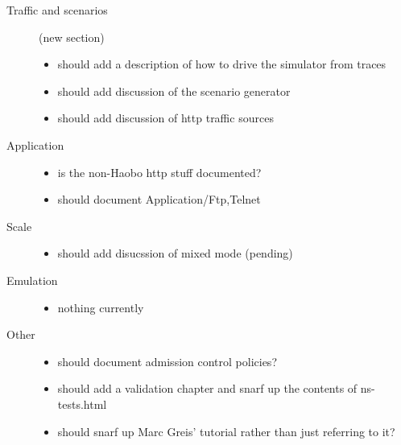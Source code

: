 \begin{description}
\item[Traffic and scenarios] (new section)

	\begin{itemize}
	\item should add a description of how to drive the simulator
		from traces
	\item should add discussion of the scenario generator
	\item should add discussion of http traffic sources
	\end{itemize}

\item[Application]

	\begin{itemize}
	\item is the non-Haobo http stuff documented?
	\item should document Application/{Ftp,Telnet}
	\end{itemize}

\item[Scale]

	\begin{itemize}
	\item should add disucssion of mixed mode (pending)
	\end{itemize}

\item[Emulation]

	\begin{itemize}
	\item nothing currently
	\end{itemize}

\item[Other]

	\begin{itemize}
	\item should document admission control policies?
	\item should add a validation chapter and snarf
		up the contents of ns-tests.html
	\item should snarf up Marc Greis' tutorial
		rather than just referring to it?
	\end{itemize}

\end{description}

